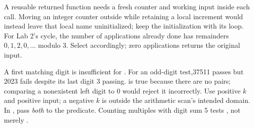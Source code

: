 \documentclass[10pt]{scrartcl}
\begin{document}
\begin{shortcuts}
\ii A reusable returned function needs a fresh counter and working input inside each call. Moving an integer counter outside while retaining a local increment would instead leave that local name uninitialized; keep the initialization with its loop.
\ii For Lab 2's cycle, the number of applications already done has remainders $0,1,2,0,\ldots$ modulo 3. Select  accordingly; zero applications returns the original input.
\end{shortcuts}
\begin{trapbox}
\ii A first matching digit is insufficient for . For an odd-digit test,37511 passes but 2023 fails despite its last digit 3 passing.
\ii {} is true because there are no pairs; comparing a nonexistent left digit to 0 would reject it incorrectly. Use positive $k$ and positive input; a negative $k$ is outside the arithmetic scan's intended domain.
\ii In , pass \emph{both}  to the predicate. Counting multiples with digit sum 5 tests , not merely .
\end{trapbox}


\end{document}
